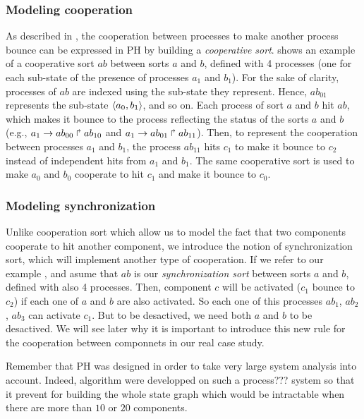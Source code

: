 \subsubsection{Modeling cooperation}

As described in \cite{PMR10-TCSB}, the cooperation between processes to make another process bounce can be
expressed in PH by building a \emph{cooperative sort}.
 shows an example of a cooperative sort $ab$ between sorts $a$ and $b$,
defined with 4 processes (one for each sub-state of the presence of processes $a_1$ and $b_1$).
For the sake of clarity, processes of $ab$ are indexed using the sub-state they represent.
Hence, $ab_{01}$ represents the sub-state $\langle a_0,b_1 \rangle$, and so on.
Each process of sort $a$ and $b$ hit $ab$, which makes it bounce to the process reflecting the status of the sorts $a$
and $b$ (e.g., $a_1\rightarrow ab_{00}\Rsh ab_{10}$ and $a_1\rightarrow ab_{01}\Rsh ab_{11}$).
Then, to represent the cooperation between processes $a_1$ and $b_1$,
the process $ab_{11}$ hits $c_1$ to make it bounce to $c_2$ instead of
independent hits from $a_1$ and $b_1$.
The same cooperative sort is used to make $a_0$ and $b_0$ cooperate to hit $c_1$ and make it bounce to $c_0$.
\subsubsection{Modeling synchronization}
Unlike cooperation sort which allow us to model the fact that two components cooperate to hit another component, we introduce
the notion of synchronization sort, which will implement another type of cooperation. If we refer to our example
, and asume that $ab$ is our \emph{synchronization sort} between sorts $a$ and $b$, defined with also 
4 processes. Then, component $c$ will be activated ($c_1$ bounce to $c_2$) if each one of $a$ and $b$ are also activated. So each 
one of this processes $ab_1$, $ab_2$, $ab_3$ can activate $c_1$. But to be desactived, we need both $a$ and $b$ to be desactived.
We will see later why it is important to introduce this new rule for the cooperation between componnets in our real case study.

Remember that PH was designed in order to take very large system analysis into account. Indeed, algorithm were developped on such a
process??? system so that it prevent for building the whole state graph which would be intractable when there are more than $10$ or 
$20$ components.

